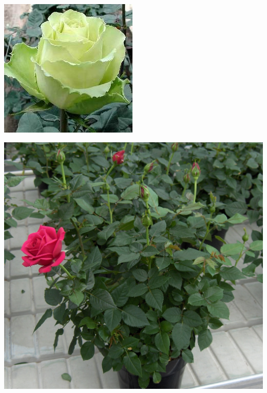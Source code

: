 \documentclass{article}
\begin{document}
\begin{center}
\includegraphics[height=0.9\textheight, angle=90]{../Rose_Limbo_Green.jpg}
\end{center}
\newpage

\begin{center}
\includegraphics[height=0.9\textheight, angle=90]{../Rose_Potted.jpg}
\end{center}
\newpage
\end{document}

